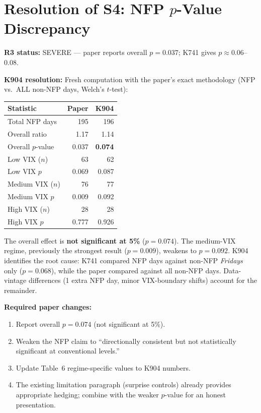 \documentclass[12pt,a4paper]{article}
\begin{document}
\bigskip

\section*{Resolution of S4: NFP $p$-Value Discrepancy}

\textbf{R3 status:} SEVERE --- paper reports overall $p = 0.037$; K741 gives $p \approx 0.06$--$0.08$.

\textbf{K904 resolution:} Fresh computation with the paper's exact methodology (NFP vs.\ ALL non-NFP days, Welch's $t$-test):

\begin{tabular}{lrr}
\toprule
\textbf{Statistic} & \textbf{Paper} & \textbf{K904} \\
\midrule
Total NFP days       & 195  & 196 \\
Overall ratio        & 1.17 & 1.14 \\
Overall $p$-value    & 0.037 & \textbf{0.074} \\
Low VIX ($n$)        & 63   & 62 \\
Low VIX $p$          & 0.069 & 0.087 \\
Medium VIX ($n$)     & 76   & 77 \\
Medium VIX $p$       & 0.009 & 0.092 \\
High VIX ($n$)       & 28   & 28 \\
High VIX $p$         & 0.777 & 0.926 \\
\bottomrule
\end{tabular}

\medskip

\noindent The overall effect is \textbf{not significant at 5\%} ($p = 0.074$).
The medium-VIX regime, previously the strongest result ($p = 0.009$), weakens to $p = 0.092$.
K904 identifies the root cause: K741 compared NFP days against non-NFP \textit{Fridays} only ($p = 0.068$), while the paper compared against all non-NFP days.
Data-vintage differences (1 extra NFP day, minor VIX-boundary shifts) account for the remainder.

\medskip

\noindent\textbf{Required paper changes:}
\begin{enumerate}[nosep]
\item Report overall $p = 0.074$ (not significant at 5\%).
\item Weaken the NFP claim to ``directionally consistent but not statistically significant at conventional levels.''
\item Update Table~6 regime-specific values to K904 numbers.
\item The existing limitation paragraph (surprise controls) already provides appropriate hedging; combine with the weaker $p$-value for an honest presentation.
\end{enumerate}
\end{document}
